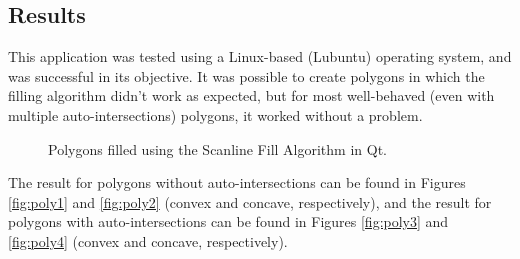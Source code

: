 \documentclass[12pt]{article}
\begin{document}
\subsection{Results}
This application was tested using a Linux-based (Lubuntu) operating system, and was successful in its objective. It was possible to create polygons in which the filling algorithm didn't work as expected, but for most well-behaved (even with multiple auto-intersections) polygons, it worked without a problem.

\begin{figure}
    \centering
    \qquad
    \caption{Polygons filled using the Scanline Fill Algorithm in Qt.}
    \label{fig:poly}
\end{figure}

The result for polygons without auto-intersections can be found in Figures \ref{fig:poly1} and \ref{fig:poly2} (convex and concave, respectively), and the result for polygons with auto-intersections can be found in Figures \ref{fig:poly3} and \ref{fig:poly4} (convex and concave, respectively).
\end{document}
